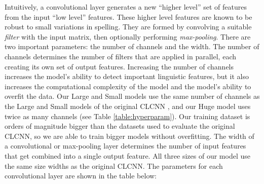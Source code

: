 \documentclass[sigconf,anonymous,review]{acmart}
\newcommand{\defn}[1]{\textit{#1}}
\begin{document}
\begin{description}
    Intuitively, a convolutional layer generates a new ``higher level'' set of features from the input ``low level'' features.
    These higher level features are known to be robust to small variations in spelling.
    They are formed by convolving a suitable \defn{filter} with the input matrix, 
    then optionally performing \defn{max-pooling}.
    There are two important parameters: the number of channels and the width.
    The number of channels determines the number of filters that are applied in parallel,
    each creating its own set of output features.
    Increasing the number of channels increases the model's ability to detect important linguistic features,
    but it also increases the computational complexity of the model and the model's ability to overfit the data.
    Our Large and Small models use the same number of channels as the Large and Small models of the original CLCNN \citep{zhang2015character},
    and our Huge model uses twice as many channels (see Table \ref{table:hyperparam}).
    Our training dataset is orders of magnitude bigger than the datasets used to evaluate the original CLCNN,
    so we are able to train bigger models without overfitting.
    The width of a convolutional or max-pooling layer determines the number of input features that get combined into a single output feature.
    All three sizes of our model use the same size widths as the original CLCNN.
    The parameters for each convolutional layer are shown in the table below:



\end{description}
\end{document}
